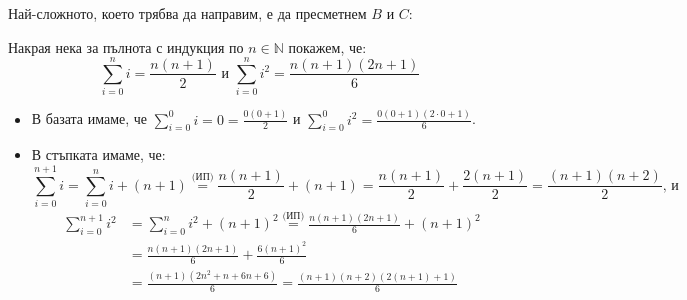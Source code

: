 Най-сложното, което трябва да направим, е да пресметнем $B$ и $C$:


Накрая нека за пълнота с индукция по $n \in \mathbb{N}$ покажем, че:
\[
  \sum\limits_{i = 0}^n i = \frac{n(n + 1)}{2} \text{ и } \sum\limits_{i = 0}^n i^2 = \frac{n(n + 1)(2n + 1)}{6}
\]
\begin{itemize}
  \item В базата имаме, че $\sum\limits_{i = 0}^0 i = 0 = \frac{0(0 + 1)}{2}$ и $\sum\limits_{i = 0}^0 i^2 = \frac{0(0 + 1)(2 \cdot 0 + 1)}{6}$.
  \item В стъпката имаме, че:
        \[
          \sum\limits_{i = 0}^{n + 1} i = \sum\limits_{i = 0}^{n} i + (n + 1) \stackrel{\text{(ИП)}}{=} \frac{n(n + 1)}{2} + (n + 1) = \frac{n(n + 1)}{2} + \frac{2(n + 1)}{2} = \frac{(n + 1)(n + 2)}{2} \text{, и}
        \]
        \begin{align*}
          \sum\limits_{i = 0}^{n + 1} i^2 & = \sum\limits_{i = 0}^{n} i^2 + (n + 1)^2 \stackrel{\text{(ИП)}}{=} \frac{n(n + 1)(2n + 1)}{6} + (n + 1)^2 \\
                                          & = \frac{n(n + 1)(2n + 1)}{6} + \frac{6(n + 1)^2}{6}                                                        \\
                                          & = \frac{(n + 1)(2n^2 + n + 6n + 6)}{6} = \frac{(n + 1)(n + 2)(2(n + 1) + 1)}{6}
        \end{align*}
\end{itemize}